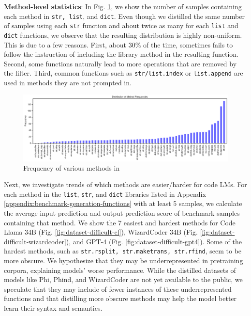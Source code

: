 \textbf{Method-level statistics}: In Fig. \ref{fig:benchmark-method-statistics}, we show the number of samples containing each method in \texttt{str, list}, and \texttt{dict}. Even though we distilled the same number of samples using each \texttt{str} function and about twice as many for each \texttt{list} and \texttt{dict} functions, we observe that the resulting distribution is highly non-uniform. This is due to a few reasons. First, about 30\% of the time, \codellamalarge sometimes fails to follow the instruction of including the library method in the resulting function. Second, some functions naturally lead to more operations that are removed by the filter. Third, common functions such as \texttt{str/list.index} or \texttt{list.append} are used in methods they are not prompted in. 

\begin{figure}[H]
    \centering
    \includegraphics[width=\textwidth]{figs/benchmark/dataset_method_frequencies.pdf}
    \caption{Frequency of various methods in \benchmark}
    \label{fig:benchmark-method-statistics}
\end{figure}

Next, we investigate trends of which methods are easier/harder for code LMs. For each method in the \texttt{list}, \texttt{str}, and \texttt{dict} libraries listed in Appendix \ref{appendix:benchmark-generation-functions} with at least 5 samples, we calculate the average input prediction and output prediction score of benchmark samples containing that method. We show the 7 easiest and hardest methods for Code Llama 34B (Fig. \ref{fig:dataset-difficult-cl}), WizardCoder 34B (Fig. \ref{fig:dataset-difficult-wizardcoder}), and GPT-4 (Fig. \ref{fig:dataset-difficult-gpt4}). Some of the hardest methods, such as \texttt{str.rsplit, str.maketrans, str.rfind}, seem to be more obscure. We hypothesize that they may be underrepresented in pretraining corpora, explaining models' worse performance. While the distilled datasets of models like Phi, Phind, and WizardCoder are not yet available to the public, we speculate that they may include of fewer instances of these underrepresented functions and that distilling more obscure methods may help the model better learn their syntax and semantics.

